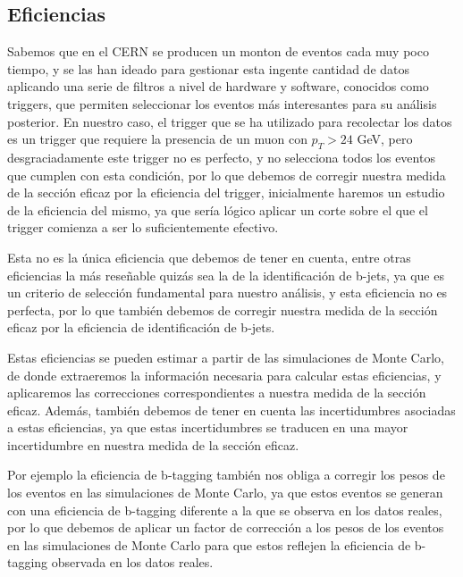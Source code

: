 \documentclass[9pt,a4paper,twocolumn,twoside]{rho-class/rho}
\begin{document}
\subsection{Eficiencias}

Sabemos que en el CERN se producen un monton de eventos cada muy poco tiempo, y se las han ideado para gestionar esta ingente cantidad de datos aplicando una serie de filtros a nivel de hardware y software, conocidos como triggers, que permiten seleccionar los eventos más interesantes para su análisis posterior. En nuestro caso, el trigger que se ha utilizado para recolectar los datos es un trigger que requiere la presencia de un muon con $p_T > 24$ GeV, pero desgraciadamente este trigger no es perfecto, y no selecciona todos los eventos que cumplen con esta condición, por lo que debemos de corregir nuestra medida de la sección eficaz por la eficiencia del trigger, inicialmente haremos un estudio de la eficiencia del mismo, ya que sería lógico aplicar un corte sobre el que el trigger comienza a ser lo suficientemente efectivo.

Esta no es la única eficiencia que debemos de tener en cuenta, entre otras eficiencias la más reseñable quizás sea la de la identificación de b-jets, ya que es un criterio de selección fundamental para nuestro análisis, y esta eficiencia no es perfecta, por lo que también debemos de corregir nuestra medida de la sección eficaz por la eficiencia de identificación de b-jets.

Estas eficiencias se pueden estimar a partir de las simulaciones de Monte Carlo, de donde extraeremos la información necesaria para calcular estas eficiencias, y aplicaremos las correcciones correspondientes a nuestra medida de la sección eficaz. Además, también debemos de tener en cuenta las incertidumbres asociadas a estas eficiencias, ya que estas incertidumbres se traducen en una mayor incertidumbre en nuestra medida de la sección eficaz.

Por ejemplo la eficiencia de b-tagging también nos obliga a corregir los pesos de los eventos en las simulaciones de Monte Carlo, ya que estos eventos se generan con una eficiencia de b-tagging diferente a la que se observa en los datos reales, por lo que debemos de aplicar un factor de corrección a los pesos de los eventos en las simulaciones de Monte Carlo para que estos reflejen la eficiencia de b-tagging observada en los datos reales.
\end{document}
